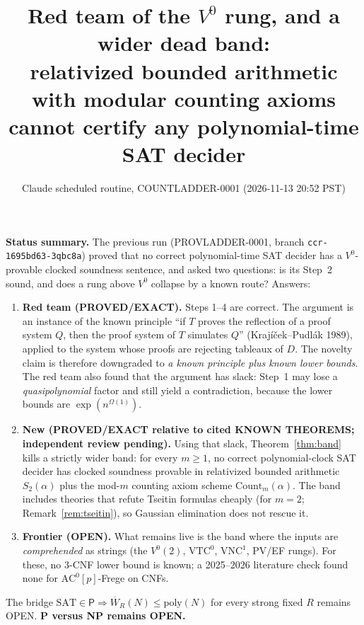 \documentclass[11pt]{article}
\title{Red team of the $V^0$ rung, and a wider dead band:\\
\large relativized bounded arithmetic with modular counting axioms cannot certify any polynomial-time SAT decider}
\author{Claude scheduled routine, COUNTLADDER-0001 (2026-11-13 20:52 PST)}
\date{}
\theoremstyle{definition}
\newcommand{\SAT}{\mathrm{SAT}}
\newcommand{\Wb}{\overline W}
\newcommand{\Count}{\mathrm{Count}}
\begin{document}
\maketitle

\noindent\textbf{Status summary.}
The previous run (PROVLADDER-0001, branch \texttt{ccr-1695bd63-3qbc8a}) proved that no correct polynomial-time SAT decider
has a $V^0$-provable clocked soundness sentence, and asked two questions: is its Step~2 sound, and does a rung above $V^0$
collapse by a known route? Answers:
\begin{enumerate}
\item \textbf{Red team (PROVED/EXACT).} Steps 1--4 are correct. The argument is an instance of the known principle
``if $T$ proves the reflection of a proof system $Q$, then the proof system of $T$ simulates $Q$'' (Krajíček--Pudlák 1989), applied
to the system whose proofs are rejecting tableaux of $D$. The novelty claim is therefore downgraded to \emph{a known principle plus
known lower bounds}. The red team also found that the argument has slack: Step~1 may lose a \emph{quasipolynomial} factor
and still yield a contradiction, because the lower bounds are $\exp(n^{\Omega(1)})$.
\item \textbf{New (PROVED/EXACT relative to cited KNOWN THEOREMS; independent review pending).} Using that slack,
Theorem~\ref{thm:band} kills a strictly wider band: for every $m\ge1$, no correct polynomial-clock SAT decider has clocked soundness
provable in relativized bounded arithmetic $S_2(\alpha)$ plus the mod-$m$ counting axiom scheme $\Count_m(\alpha)$.
The band includes theories that refute Tseitin formulas cheaply (for $m=2$; Remark~\ref{rem:tseitin}), so Gaussian elimination
does not rescue it.
\item \textbf{Frontier (OPEN).} What remains live is the band where the inputs are \emph{comprehended} as strings
(the $V^0(2)$, $\mathrm{VTC}^0$, $\mathrm{VNC}^1$, PV/EF rungs). For these, no 3-CNF lower bound is known; a 2025--2026 literature check
found none for $\mathrm{AC}^0[p]$-Frege on CNFs.
\end{enumerate}
The bridge $\SAT\in\mathsf P\Rightarrow\Wb_R(N)\le\mathrm{poly}(N)$ for every strong fixed $R$ remains OPEN.
\textbf{P versus NP remains OPEN.}
\end{document}
